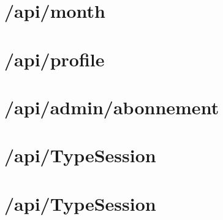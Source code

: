 \vspace{\baselineskip}
\section{/api/month}
	
	

\vspace{\baselineskip}
\section{/api/profile}
	
	

\newpage
\section{/api/admin/abonnement}
	
	
	
\newpage
\section{/api/TypeSession}
	


\vspace{\baselineskip}
\section{/api/TypeSession}
	
